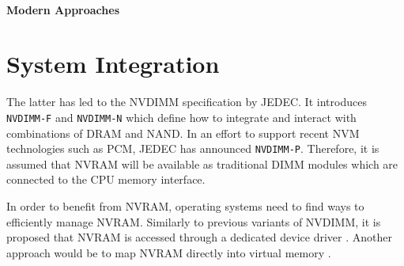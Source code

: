 
\paragraph{Modern Approaches} %




\section{System Integration}


The latter has led to the NVDIMM specification by JEDEC. It introduces
\texttt{NVDIMM-F} and \texttt{NVDIMM-N} which define how to integrate and
interact with combinations of DRAM and NAND. In an effort to
support recent NVM technologies such as PCM, JEDEC has announced
\texttt{NVDIMM-P}\cite{jedec2017nvdimm}. Therefore, it is assumed that NVRAM
will be available as traditional DIMM modules which are connected to the CPU
memory interface\cite{condit2009better}.


In order to benefit from NVRAM, operating systems need to find ways to efficiently manage NVRAM. Similarly
to previous variants of NVDIMM, it is proposed that NVRAM is accessed
through a dedicated device driver \cite{intel2017nvdimm}. Another approach would
be to map NVRAM directly into virtual memory .

